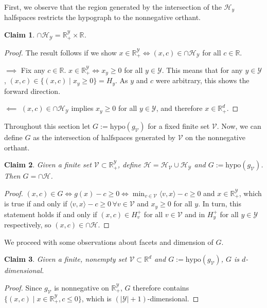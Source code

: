 \documentclass[11pt]{article}
\newcommand{\Comments}{1}
\newcommand{\mynote}[2]{\ifnum\Comments=1\textcolor{#1}{#2}\fi}
\newcommand{\raf}[1]{\mynote{darkgreen}{[RF: #1]}}
\newcommand{\reals}{\mathbb{R}}
\renewcommand{\H}{\mathcal{H}}
\newcommand{\V}{\mathcal{V}}
\newcommand{\Y}{\mathcal{Y}}
\newcommand{\inprod}[2]{\langle #1, #2 \rangle}%
\newcommand{\hyp}{\mathrm{hypo}}
\newtheorem{claim}{Claim}
\begin{document}
First, we observe that the region generated by the intersection of the $\H_y$ halfspaces restricts the hypograph to the nonnegative orthant.
\begin{claim}\label{claim:x-nonneg-orthant-iff-intersection-HY}
  $\cap \H_\Y = \reals^\Y_+ \times \reals$.
\end{claim}
\begin{proof}
  The result follows if we show $x \in \reals^\Y_+ \iff (x,c) \in \cap \H_\Y$ for all $c \in \reals$.

  $\implies$
  Fix any $c \in \reals$.
  $x \in \reals^\Y_+ \iff x_y \geq 0$ for all $y \in \Y$.
  This means that for any $y \in \Y$, $(x,c) \in \{(x,c) \mid x_y \geq 0\} = H_y$.
  As $y$ and $c$ were arbitrary, this shows the forward direction.
  
  $\impliedby$
  $(x,c) \in \cap \H_\Y$ implies $x_y \geq 0$ for all $y \in \Y$, and therefore $x \in \reals^d_+$.	
\end{proof}

Throughout this section let $G:= \hyp(g_\V)$ for a fixed finite set $\V$.
Now, we can define $G$ as the intersection of halfspaces generated by $\V$ on the nonnegative orthant.
\begin{claim}\label{claim:G-intersection-H}
  Given a finite set $\V \subset \reals^\Y_+$, define $\H = \H_\V \cup \H_\Y$ and $G := \hyp(g_\V)$.
  Then $G = \cap \H$.
\end{claim}
\begin{proof}
  $(x,c) \in G \iff g(x) - c \geq 0 \iff \min_{v \in \V}\inprod{v}{x} - c \geq 0$ and $x \in \reals_+^\Y$, which is true if and only if $\inprod{v}{x} - c \geq 0 \,\forall v \in \V$ and $x_y \geq 0$ for all $y$.
  In turn, this statement holds if and only if $(x,c) \in H^+_v$ for all $v \in \V$ and in $H^+_y$ for all $y \in \Y$ respectively, so $(x,c) \in \cap \H$.
\end{proof}

We proceed with some observations about facets and dimension of $G$.

\begin{claim}\label{claim:G-full-dimensional}
  Given a finite, nonempty set $\V \subset \reals^d$ and $G := \hyp(g_\V)$, $G$ is $d$-dimensional.  %
\end{claim}
\begin{proof}
  Since $g_\V$ is nonnegative on $\reals_+^\Y$, $G$ therefore contains $\{(x,c) \mid x\in\reals^\Y_+, c \leq 0\}$, which is $(|\Y| + 1)$-dimensional.
\end{proof}
\end{document}
